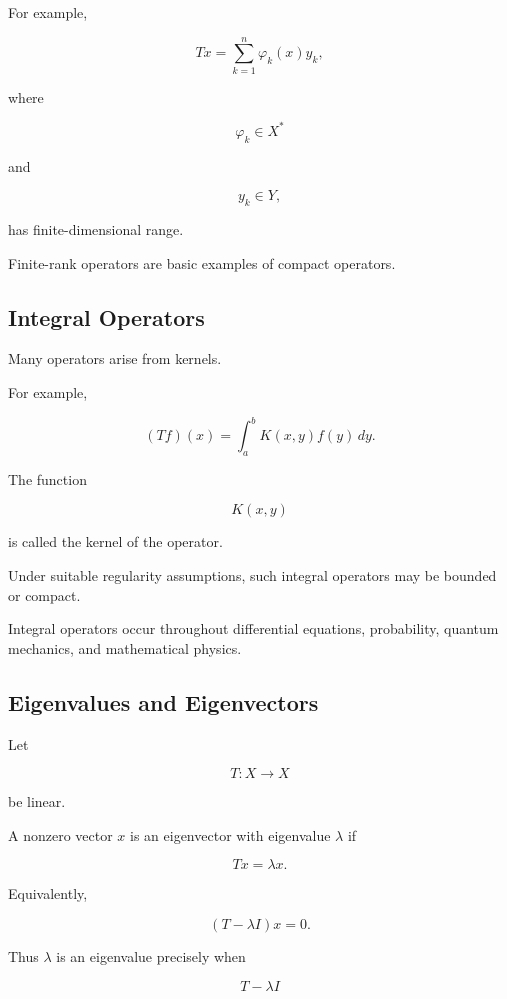 For example,

\[
Tx
=
\sum_{k=1}^{n}
\varphi_k(x)y_k,
\]

where

\[
\varphi_k\in X^*
\]

and

\[
y_k\in Y,
\]

has finite-dimensional range.

Finite-rank operators are basic examples of compact operators.

\subsection{Integral Operators}
\label{subsec:integral-operators-functional}

Many operators arise from kernels.

For example,

\[
\boxed{
(Tf)(x)
=
\int_a^b
K(x,y)f(y)\,dy.
}
\]

The function

\[
K(x,y)
\]

is called the kernel of the operator.

Under suitable regularity assumptions, such integral operators may be
bounded or compact.

Integral operators occur throughout differential equations, probability,
quantum mechanics, and mathematical physics.

\subsection{Eigenvalues and Eigenvectors}
\label{subsec:eigenvalues-functional}

Let

\[
T:X\to X
\]

be linear.

A nonzero vector \(x\) is an eigenvector with eigenvalue \(\lambda\) if

\[
\boxed{
Tx=\lambda x.
}
\]

Equivalently,

\[
\boxed{
(T-\lambda I)x=0.
}
\]

Thus \(\lambda\) is an eigenvalue precisely when

\[
T-\lambda I
\]

